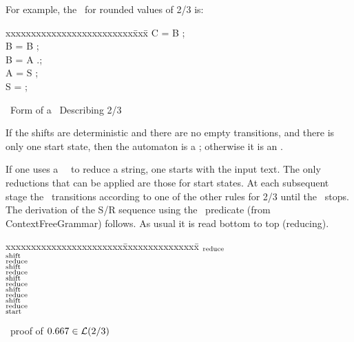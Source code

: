 For example, the \cfg\ for rounded values of 2/3 is:
\begin{tt}
\begin{tabbing}
xxxxxxxxxxxxxxxxxxxxxxxxx\=xxx\=\kill
\>C = B \sq;                 \\
\>B = B \sq;                 \\
\>B = A \sq.\sq;                  \\
\>A = S \sq;                 \\
\>S = ;
\end{tabbing}
\end{tt}
\begin{center}
\cfg\ Form of a \dfa\ Describing 2/3
\end{center}

If the shifts are deterministic and there are no empty transitions,
and there is only one start state, then the automaton is a \dfa;
otherwise it is an \nfa. 

If one uses a \fa\ \cfg\ to reduce a string, one starts with the input text.
The only reductions that can be applied are those for start states.  
At each subsequent stage the \fa\ transitions according to
one of the other rules for 2/3 until the \fa\ stops.  
The derivation of the S/R sequence using the \sform\ predicate 
(from ContextFreeGrammar) follows.  
As usual it is read bottom to top (reducing).

\begin{tt}
\begin{tabbing}
xxxxxxxxxxxxxxxxxxxxxxx\=xxxxxxxxxxxxxxx\=\kill
{}    \>$_{\rm reduce}$             \\
   \>$_{\rm shift}$              \\
            \>$_{\rm reduce}$             \\
           \>$_{\rm shift}$              \\
           \>$_{\rm reduce}$             \\
          \>$_{\rm shift}$              \\
          \>$_{\rm reduce}$             \\
         \>$_{\rm shift}$              \\
         \>$_{\rm reduce}$             \\
        \>$_{\rm shift}$              \\
        \>$_{\rm reduce}$             \\
 \>$_{\rm start}$
\end{tabbing}
\end{tt}
\begin{center}
\cfg\ proof of $0.667 \in {\cal L}(2/3)$
\end{center}


